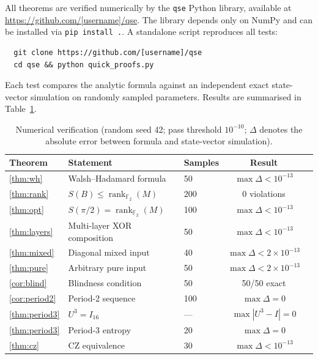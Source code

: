 \documentclass[11pt,a4paper]{article}
\newcommand{\F}{\mathbb{F}}
\newcommand{\rk}{\operatorname{rank}_{\F_2}}
\newcommand{\VNE}{S}
\begin{document}
All theorems are verified numerically by the \texttt{qse} Python library,
available at \url{https://github.com/[username]/qse}.
The library depends only on NumPy and can be installed via
\texttt{pip install .}.  A standalone script reproduces all tests:
\begin{verbatim}
  git clone https://github.com/[username]/qse
  cd qse && python quick_proofs.py
\end{verbatim}

Each test compares the analytic formula against an independent
exact state-vector simulation on randomly sampled parameters.
Results are summarised in Table~\ref{tab:results}.

\begin{table}[h]
\centering
\begin{tabular}{lllcc}
\toprule
Theorem & Statement & Samples & Result \\
\midrule
\ref{thm:wh}     & Walsh–Hadamard formula            & 50  & $\max\Delta < 10^{-13}$ \\
\ref{thm:rank}   & $\VNE(B) \leq \rk(M)$            & 200 & 0 violations            \\
\ref{thm:opt}    & $\VNE(\pi/2) = \rk(M)$           & 100 & $\max\Delta < 10^{-13}$ \\
\ref{thm:layers} & Multi-layer XOR composition       & 50  & $\max\Delta < 10^{-13}$ \\
\ref{thm:mixed}  & Diagonal mixed input              & 40  & $\max\Delta < 2\times10^{-13}$ \\
\ref{thm:pure}   & Arbitrary pure input              & 50  & $\max\Delta < 2\times10^{-13}$ \\
\ref{cor:blind}  & Blindness condition               & 50  & 50/50 exact             \\
\ref{cor:period2}& Period-2 sequence                 & 100 & $\max\Delta = 0$        \\
\ref{thm:period3}& $U^3 = I_{16}$                   & —   & $\max|U^3 - I| = 0$    \\
\ref{thm:period3}& Period-3 entropy                 & 20  & $\max\Delta = 0$        \\
\ref{thm:cz}     & CZ equivalence                    & 30  & $\max\Delta < 10^{-13}$ \\
\bottomrule
\end{tabular}
\caption{Numerical verification (random seed 42; pass threshold $10^{-10}$;
$\Delta$ denotes the absolute error between formula and state-vector simulation).}
\label{tab:results}
\end{table}
\end{document}
